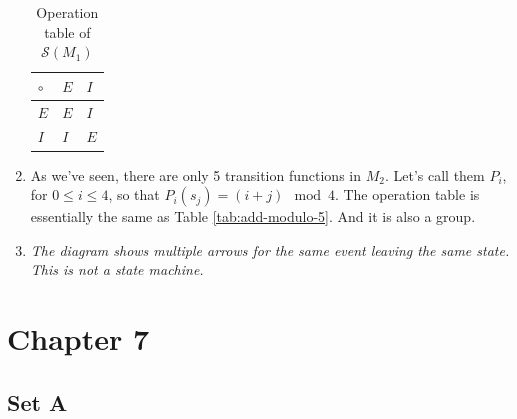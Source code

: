 \documentclass{article}
\begin{document}
\begin{enumerate}
    \begin{table}[!ht]
        \centering
        \begin{tabular}{l|ll}
        $\circ$ & $E$ & $I$ \\ \hline
        $E$     & $E$ & $I$ \\
        $I$     & $I$ & $E$
        \end{tabular}
        \caption{Operation table of $\mathscr{S}(M_1)$}
        \label{tab:op-semigroup-m1}
    \end{table}
    
    \item As we've seen, there are only 5 transition functions in $M_2$. Let's call them $P_i$, for $0 \leqslant i \leqslant 4$, so that $P_i(s_j) = (i + j) \mod 4$. The operation table is essentially the same as Table \ref{tab:add-modulo-5}. And it is also a group.

    \item \emph{The diagram shows multiple arrows for the same event leaving the same state. This is not a state machine.}
\end{enumerate}

\section{Chapter 7}

\subsection{Set A}
\end{document}
